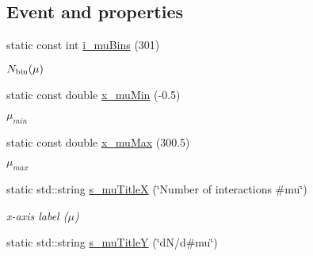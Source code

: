\subsection*{Event and properties}
\begin{CompactItemize}
\item 
\hypertarget{namespaceHistGroupCfg_f89647684f04801ae7f29b45b38534fd}{
static const int \hyperlink{namespaceHistGroupCfg_f89647684f04801ae7f29b45b38534fd}{i\_\-mu\-Bins} (301)}
\label{namespaceHistGroupCfg_f89647684f04801ae7f29b45b38534fd}

\begin{CompactList}\small\item\em $N_{\rm bin}(\mu)$ \item\end{CompactList}\item 
\hypertarget{namespaceHistGroupCfg_d06bd366a1f69d84e64edec71f5c7f57}{
static const double \hyperlink{namespaceHistGroupCfg_d06bd366a1f69d84e64edec71f5c7f57}{x\_\-mu\-Min} (-0.5)}
\label{namespaceHistGroupCfg_d06bd366a1f69d84e64edec71f5c7f57}

\begin{CompactList}\small\item\em $\mu_{min}$ \item\end{CompactList}\item 
\hypertarget{namespaceHistGroupCfg_fb94d6ee73177deef3a9eb99c592c376}{
static const double \hyperlink{namespaceHistGroupCfg_fb94d6ee73177deef3a9eb99c592c376}{x\_\-mu\-Max} (300.5)}
\label{namespaceHistGroupCfg_fb94d6ee73177deef3a9eb99c592c376}

\begin{CompactList}\small\item\em $\mu_{max}$ \item\end{CompactList}\item 
\hypertarget{namespaceHistGroupCfg_63eacc2facd7db426adcf228a48e8f51}{
static std::string \hyperlink{namespaceHistGroupCfg_63eacc2facd7db426adcf228a48e8f51}{s\_\-mu\-Title\-X} (\char`\"{}Number of interactions \#mu\char`\"{})}
\label{namespaceHistGroupCfg_63eacc2facd7db426adcf228a48e8f51}

\begin{CompactList}\small\item\em x-axis label ($\mu$) \item\end{CompactList}\item 
\hypertarget{namespaceHistGroupCfg_623286d99959cdb1a2b9dda657e25739}{
static std::string \hyperlink{namespaceHistGroupCfg_623286d99959cdb1a2b9dda657e25739}{s\_\-mu\-Title\-Y} (\char`\"{}d\-N/d\#mu\char`\"{})}
\label{namespaceHistGroupCfg_623286d99959cdb1a2b9dda657e25739}


\end{CompactItemize}
